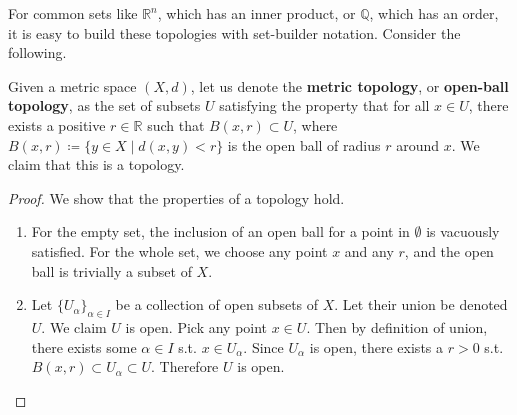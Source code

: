   For common sets like $\mathbb{R}^n$, which has an inner product, or $\mathbb{Q}$, which has an order, it is easy to build these topologies with set-builder notation. Consider the following. 

  \begin{definition}
    \label{def:metric-topology}
    Given a metric space $(X, d)$, let us denote the \textbf{metric topology}, or \textbf{open-ball topology}, as the set of subsets $U$ satisfying the property that for all $x \in U$, there exists a positive $r \in \mathbb{R}$ such that $B(x, r) \subset U$, where $B(x, r) \coloneqq \{y \in X \mid d(x, y) < r\}$ is the open ball of radius $r$ around $x$. We claim that this is a topology. 
  \end{definition} 
  \begin{proof}
    We show that the properties of a topology hold. 
    \begin{enumerate} 
      \item For the empty set, the inclusion of an open ball for a point in $\emptyset$ is vacuously satisfied. For the whole set, we choose any point $x$ and any $r$, and the open ball is trivially a subset of $X$. 

      \item Let $\{U_\alpha\}_{\alpha \in I}$ be a collection of open subsets of $X$. Let their union be denoted $U$. We claim $U$ is open. Pick any point $x \in U$. Then by definition of union, there exists some $\alpha \in I$ s.t. $x \in U_\alpha$. Since $U_\alpha$ is open, there exists a $r > 0$ s.t. $B(x, r) \subset U_\alpha \subset U$. Therefore $U$ is open. 


\end{enumerate}
\end{proof}

